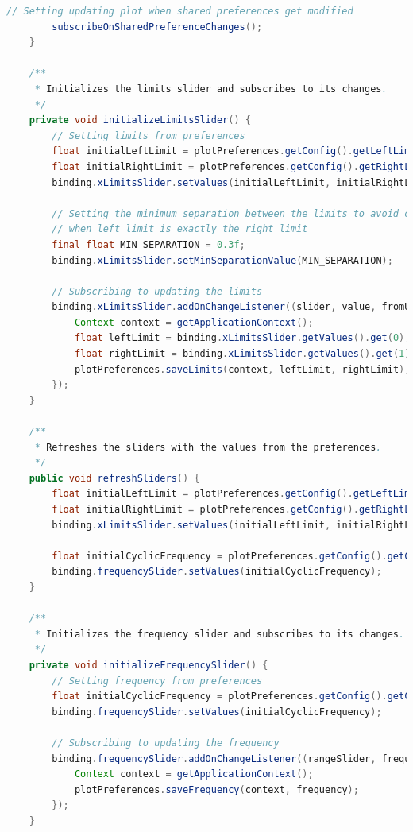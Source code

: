 \documentclass[oneside,solution]{android-assign}
\begin{document}
\begin{lstlisting}[language=java]
        // Setting updating plot when shared preferences get modified
        subscribeOnSharedPreferenceChanges();
    }

    /**
     * Initializes the limits slider and subscribes to its changes.
     */
    private void initializeLimitsSlider() {
        // Setting limits from preferences
        float initialLeftLimit = plotPreferences.getConfig().getLeftLimit();
        float initialRightLimit = plotPreferences.getConfig().getRightLimit();
        binding.xLimitsSlider.setValues(initialLeftLimit, initialRightLimit);

        // Setting the minimum separation between the limits to avoid cases
        // when left limit is exactly the right limit
        final float MIN_SEPARATION = 0.3f;
        binding.xLimitsSlider.setMinSeparationValue(MIN_SEPARATION);

        // Subscribing to updating the limits
        binding.xLimitsSlider.addOnChangeListener((slider, value, fromUser) -> {
            Context context = getApplicationContext();
            float leftLimit = binding.xLimitsSlider.getValues().get(0);
            float rightLimit = binding.xLimitsSlider.getValues().get(1);
            plotPreferences.saveLimits(context, leftLimit, rightLimit);
        });
    }

    /**
     * Refreshes the sliders with the values from the preferences.
     */
    public void refreshSliders() {
        float initialLeftLimit = plotPreferences.getConfig().getLeftLimit();
        float initialRightLimit = plotPreferences.getConfig().getRightLimit();
        binding.xLimitsSlider.setValues(initialLeftLimit, initialRightLimit);

        float initialCyclicFrequency = plotPreferences.getConfig().getCyclicFrequency();
        binding.frequencySlider.setValues(initialCyclicFrequency);
    }

    /**
     * Initializes the frequency slider and subscribes to its changes.
     */
    private void initializeFrequencySlider() {
        // Setting frequency from preferences
        float initialCyclicFrequency = plotPreferences.getConfig().getCyclicFrequency();
        binding.frequencySlider.setValues(initialCyclicFrequency);

        // Subscribing to updating the frequency
        binding.frequencySlider.addOnChangeListener((rangeSlider, frequency, b) -> {
            Context context = getApplicationContext();
            plotPreferences.saveFrequency(context, frequency);
        });
    }


\end{lstlisting}
\end{document}
